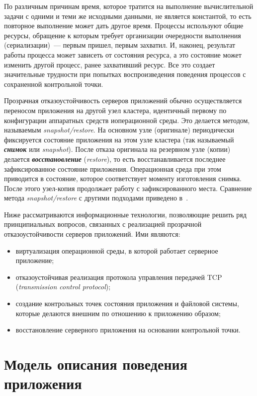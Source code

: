 \begin{multicols}{2}
{По различным  причинам время, которое тратится на выполнение
вычислительной задачи с одними и теми же исходными данными, не является
константой, то есть повторное выполнение может дать другое время. Процессы
используют общие ресурсы, обращение к которым требует организации
очередности выполнения (сериализации)~--- первым пришел, первым захватил.
И, наконец,  результат работы процесса может зависеть от состояния ресурса, а
это состояние может изменить другой процесс, ранее захвативший ресурс. Все
это создает значительные трудности при попытках воспроизведения поведения
процессов с сохраненной  контрольной точки.

Прозрачная отказоустойчивость серверов приложений обычно
осуществляется переносом при\-ло\-же\-ния на другой узел кластера, идентичный
первому по конфигурации аппаратных средств и\linebreak операционной среды. Это
делается методом, на\-зы\-ва\-емым \textit{snapshot/restore}. На основном узле
(оригинале)  периодически фиксируется состояние приложения на этом узле
кластера (так называемый {\bfseries\textit{снимок}} или
\textit{snapshot}). После отказа
оригинала на резервном узле (копии) делается {\bfseries\textit{восстановление}}
(\textit{restore}), то есть восстанавливается последнее
 зафиксированное
состояние приложения. Операционная среда при этом приводится в состояние,
которое соответствует моменту изготовления снимка. После этого узел-копия
продолжает работу с зафиксированного места.  Сравнение метода
\textit{snapshot/restore} с другими подходами приведено в~\cite{7zak}.

Ниже рассматриваются информационные  технологии, позволяющие решить
ряд принципиальных вопросов, связанных с реализацией прозрачной
отказоустойчивости серверов приложений. Ими являются:
\begin{itemize}
\item виртуализация операционной среды, в которой работает серверное
приложение;
\item отказоустойчивая реализация протокола управ\-ле\-ния передачей TCP
(\textit{transmission control protocol});
\item создание контрольных точек состояния приложения и файловой
системы, которые делаются внешним по отношению к приложению образом;
\item восстановление серверного приложения на осно\-ва\-нии контрольной
точки.
\end{itemize}

}

\section{Модель описания поведения приложения}


\end{multicols}

